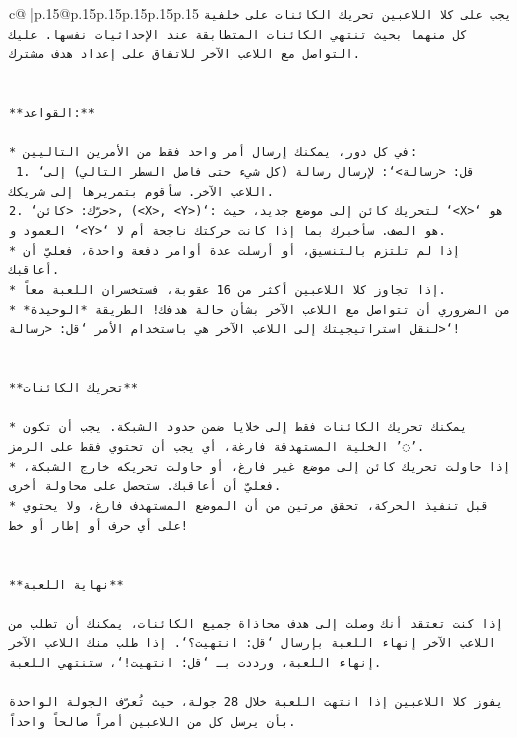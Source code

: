 \documentclass{article}
\begin{document}
{\begin{supertabular}{c@{$\;$}|p{.15\linewidth}@{}p{.15\linewidth}p{.15\linewidth}p{.15\linewidth}p{.15\linewidth}p{.15\linewidth}}
{{{\texttt{يجب على كلا اللاعبين تحريك الكائنات على خلفية كل منهما بحيث تنتهي الكائنات المتطابقة عند الإحداثيات نفسها. عليك التواصل مع اللاعب الآخر للاتفاق على إعداد هدف مشترك.} \\
\\ 
\\ 
\texttt{**القواعد:**} \\
\\ 
\texttt{* في كل دور، يمكنك إرسال أمر واحد فقط من الأمرين التاليين:} \\
\texttt{ 1. `قل: <رسالة>`: لإرسال رسالة (كل شيء حتى فاصل السطر التالي) إلى اللاعب الآخر. سأقوم بتمريرها إلى شريكك.} \\
\texttt{2. `حرّك: <كائن>, (<X>, <Y>)`: لتحريك كائن إلى موضع جديد، حيث `<X>` هو العمود و `<Y>` هو الصف. سأخبرك بما إذا كانت حركتك ناجحة أم لا.} \\
\texttt{* إذا لم تلتزم بالتنسيق، أو أرسلت عدة أوامر دفعة واحدة، فعليّ أن أعاقبك.} \\
\texttt{* إذا تجاوز كلا اللاعبين أكثر من 16 عقوبة، فستخسران اللعبة معاً.} \\
\texttt{* من الضروري أن تتواصل مع اللاعب الآخر بشأن حالة هدفك! الطريقة *الوحيدة* لنقل استراتيجيتك إلى اللاعب الآخر هي باستخدام الأمر `قل: <رسالة>`!} \\
\\ 
\\ 
\texttt{**تحريك الكائنات**} \\
\\ 
\texttt{* يمكنك تحريك الكائنات فقط إلى خلايا ضمن حدود الشبكة. يجب أن تكون الخلية المستهدفة فارغة، أي يجب أن تحتوي فقط على الرمز '◌'.} \\
\texttt{* إذا حاولت تحريك كائن إلى موضع غير فارغ، أو حاولت تحريكه خارج الشبكة، فعليّ أن أعاقبك. ستحصل على محاولة أخرى.} \\
\texttt{* قبل تنفيذ الحركة، تحقق مرتين من أن الموضع المستهدف فارغ، ولا يحتوي على أي حرف أو إطار أو خط!} \\
\\ 
\\ 
\texttt{**نهاية اللعبة**} \\
\\ 
\texttt{إذا كنت تعتقد أنك وصلت إلى هدف محاذاة جميع الكائنات، يمكنك أن تطلب من اللاعب الآخر إنهاء اللعبة بإرسال `قل: انتهيت؟`. إذا طلب منك اللاعب الآخر إنهاء اللعبة، ورددت بـ `قل: انتهيت!`، ستنتهي اللعبة.} \\
\\ 
\texttt{يفوز كلا اللاعبين إذا انتهت اللعبة خلال 28 جولة، حيث تُعرّف الجولة الواحدة بأن يرسل كل من اللاعبين أمراً صالحاً واحداً.} \\
}}}
\end{supertabular}}
\end{document}
